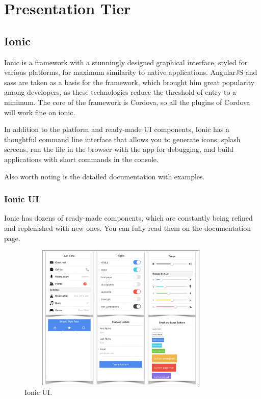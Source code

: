 \section{Presentation Tier}

\subsection{Ionic}
Ionic is a framework with a stunningly designed graphical interface, styled for various platforms, for maximum similarity to native applications. AngularJS and sass are taken as a basis for the framework, which brought him great popularity among developers, as these technologies reduce the threshold of entry to a minimum. The core of the framework is Cordova, so all the plugins of Cordova will work fine on ionic.\par In addition to the platform and ready-made UI components, Ionic has a thoughtful command line interface that allows you to generate icons, splash screens, run the file in the browser with the app for debugging, and build applications with short commands in the console.\par Also worth noting is the detailed documentation with examples.\cite{Ionic}

\subsubsection{Ionic UI}
Ionic has dozens of ready-made components, which are constantly being refined and replenished with new ones. You can fully read them on the documentation page.\cite{IonicUI}

\begin{figure}[h]
\centering
\includegraphics[width=10cm, height=7cm]{img/IonicUI.png}
\caption{Ionic UI.}
\end{figure}

